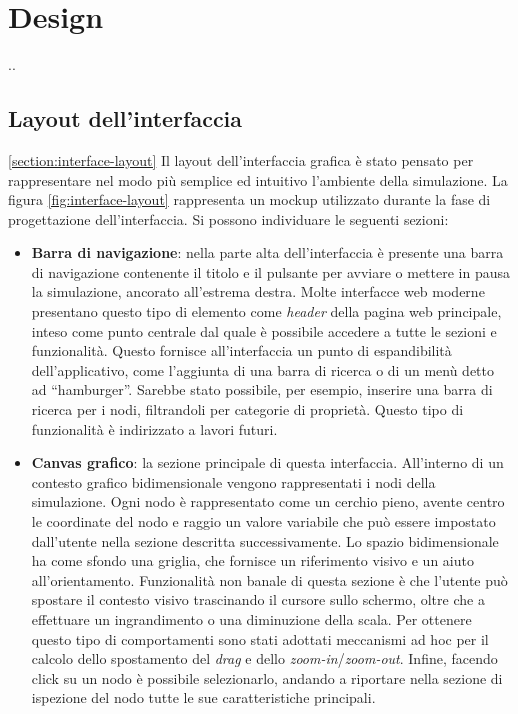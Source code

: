 \chapter{Design}..
\section{Layout dell'interfaccia} \ref{section:interface-layout}
Il layout dell'interfaccia grafica è stato pensato per rappresentare nel modo più semplice ed intuitivo l'ambiente della simulazione.  La figura \ref{fig:interface-layout} rappresenta un mockup utilizzato durante la fase di progettazione dell'interfaccia. Si possono individuare le seguenti sezioni:
\begin{itemize}
	\item \textbf{Barra di navigazione}: nella parte alta dell'interfaccia è presente una barra di navigazione contenente il titolo e il pulsante per avviare o mettere in pausa la simulazione, ancorato all'estrema destra. Molte interfacce web moderne presentano questo tipo di elemento come \textit{header} della pagina web principale, inteso come punto centrale dal quale è possibile accedere a tutte le sezioni e funzionalità. Questo fornisce all'interfaccia un punto di espandibilità dell'applicativo, come l'aggiunta di una barra di ricerca o di un menù detto ad ``hamburger''. Sarebbe stato possibile, per esempio, inserire una barra di ricerca per i nodi, filtrandoli per categorie di proprietà. Questo tipo di funzionalità è indirizzato a lavori futuri. 
	\item \textbf{Canvas grafico}: la sezione principale di questa interfaccia. All'interno di un contesto grafico bidimensionale vengono rappresentati i nodi della simulazione. Ogni nodo è rappresentato come un cerchio pieno, avente centro le coordinate del nodo e raggio un valore variabile che può essere impostato dall'utente nella sezione descritta successivamente. Lo spazio bidimensionale ha come sfondo una griglia, che  fornisce un riferimento visivo e un aiuto all'orientamento. Funzionalità non banale di questa sezione è che l'utente può spostare il contesto visivo trascinando il cursore sullo schermo, oltre che a effettuare un ingrandimento o una diminuzione della scala. Per ottenere questo tipo di comportamenti sono stati adottati meccanismi ad hoc per il calcolo dello spostamento del \textit{drag} e dello \textit{zoom-in}/\textit{zoom-out}. Infine, facendo click su un nodo è possibile selezionarlo, andando a riportare nella sezione di ispezione del nodo tutte le sue caratteristiche principali.

\end{itemize}
